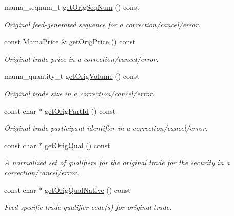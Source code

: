 \begin{CompactItemize}
mama\_\-seqnum\_\-t \hyperlink{classWombat_1_1MamdaTradeListener_571a08fa4c669481abf0417a36064205}{get\-Orig\-Seq\-Num} () const 
\begin{CompactList}\small\item\em Original feed-generated sequence for a correction/cancel/error. \item\end{CompactList}\item 
const Mama\-Price \& \hyperlink{classWombat_1_1MamdaTradeListener_7550297d285f7e2ab6b6e7060ed28f74}{get\-Orig\-Price} () const 
\begin{CompactList}\small\item\em Original trade price in a correction/cancel/error. \item\end{CompactList}\item 
mama\_\-quantity\_\-t \hyperlink{classWombat_1_1MamdaTradeListener_0e179272d95923e3da5df3bf67bfb643}{get\-Orig\-Volume} () const 
\begin{CompactList}\small\item\em Original trade size in a correction/cancel/error. \item\end{CompactList}\item 
const char $\ast$ \hyperlink{classWombat_1_1MamdaTradeListener_473edf5c6bb8db20a5d2d57f503d7601}{get\-Orig\-Part\-Id} () const 
\begin{CompactList}\small\item\em Original trade participant identifier in a correction/cancel/error. \item\end{CompactList}\item 
const char $\ast$ \hyperlink{classWombat_1_1MamdaTradeListener_65563a27266a0f48eff3f44b5a4216b7}{get\-Orig\-Qual} () const 
\begin{CompactList}\small\item\em A normalized set of qualifiers for the original trade for the security in a correction/cancel/error. \item\end{CompactList}\item 
const char $\ast$ \hyperlink{classWombat_1_1MamdaTradeListener_3d7a8290418015b6f8e1bc2e412225b1}{get\-Orig\-Qual\-Native} () const 
\begin{CompactList}\small\item\em Feed-specific trade qualifier code(s) for original trade. \item\end{CompactList}\item 

\end{CompactItemize}

